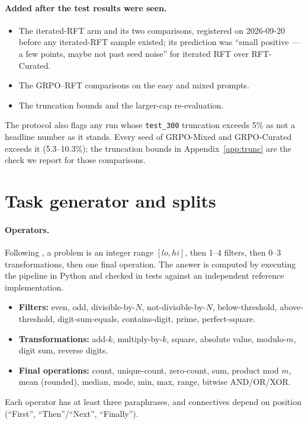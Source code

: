 \documentclass{article}
\begin{document}
\paragraph{Added after the test results were seen.}
\begin{itemize}
  \item The iterated-RFT arm and its two comparisons, registered on 2026-09-20 before any iterated-RFT sample existed; its prediction was ``small positive --- a few points, maybe not past seed noise'' for iterated RFT over RFT-Curated.
  \item The GRPO--RFT comparisons on the easy and mixed prompts.
  \item The truncation bounds and the larger-cap re-evaluation.
\end{itemize}
The protocol also flags any run whose \texttt{test\_300} truncation exceeds 5\% as not a headline number as it stands. Every seed of GRPO-Mixed and GRPO-Curated exceeds it (5.3--10.3\%); the truncation bounds in Appendix~\ref{app:trunc} are the check we report for those comparisons.

\section{Task generator and splits}
\label{app:task}

\paragraph{Operators.} Following \citet{bauer2026}, a problem is an integer range $[lo, hi]$, then 1--4 filters, then 0--3 transformations, then one final operation. The answer is computed by executing the pipeline in Python and checked in tests against an independent reference implementation.
\begin{itemize}
  \item \textbf{Filters:} even, odd, divisible-by-$N$, not-divisible-by-$N$, below-threshold, above-threshold, digit-sum-equals, contains-digit, prime, perfect-square.
  \item \textbf{Transformations:} add-$k$, multiply-by-$k$, square, absolute value, modulo-$m$, digit sum, reverse digits.
  \item \textbf{Final operations:} count, unique-count, zero-count, sum, product mod $m$, mean (rounded), median, mode, min, max, range, bitwise AND/OR/XOR.
\end{itemize}
Each operator has at least three paraphrases, and connectives depend on position (``First'', ``Then''/``Next'', ``Finally'').
\end{document}
